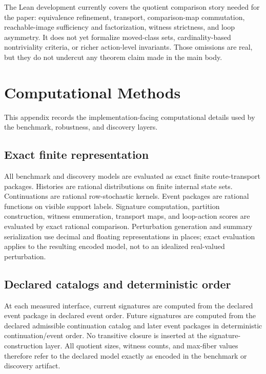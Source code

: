 \documentclass[11pt]{article}
\theoremstyle{definition}
\begin{document}
The Lean development currently covers the quotient comparison story needed for the paper: equivalence refinement, transport, comparison-map commutation, reachable-image sufficiency and factorization, witness strictness, and loop asymmetry. It does not yet formalize moved-class sets, cardinality-based nontriviality criteria, or richer action-level invariants. Those omissions are real, but they do not undercut any theorem claim made in the main body.

\section{Computational Methods}\label{app:computational-methods}
This appendix records the implementation-facing computational details used by the benchmark, robustness, and discovery layers.

\subsection{Exact finite representation}\label{appsubsec:comp-exact}
All benchmark and discovery models are evaluated as exact finite route-transport packages. Histories are rational distributions on finite internal state sets. Continuations are rational row-stochastic kernels. Event packages are rational functions on visible support labels. Signature computation, partition construction, witness enumeration, transport maps, and loop-action scores are evaluated by exact rational comparison. Perturbation generation and summary serialization use decimal and floating representations in places; exact evaluation applies to the resulting encoded model, not to an idealized real-valued perturbation.

\subsection{Declared catalogs and deterministic order}\label{appsubsec:comp-order}
At each measured interface, current signatures are computed from the declared event package in declared event order. Future signatures are computed from the declared admissible continuation catalog and later event packages in deterministic continuation/event order. No transitive closure is inserted at the signature-construction layer. All quotient sizes, witness counts, and max-fiber values therefore refer to the declared model exactly as encoded in the benchmark or discovery artifact.
\end{document}
